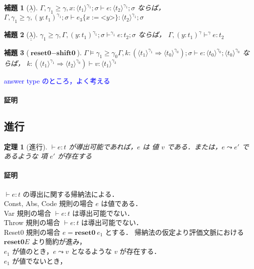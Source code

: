 \documentclass[10pt,a4j]{jarticle}
\newcommand\blue[1]{\textcolor{blue}{#1}}
\newcommand\Resetz{\textbf{reset0}}
\newcommand\Shiftz{\textbf{shift0}}
\newcommand\cfun[2]{\underline{\lambda}{#1}.{#2}}
\newcommand\ccfun[2]{\underline{\underline{\lambda}}{#1}.{#2}}
\newcommand\code[1]{\texttt{<}{#1}\texttt{>}}
\newcommand\codeT[2]{\langle{#1}\rangle^{#2}}
\newcommand\contT[2]{({#1} \Rightarrow {#2})}
\newcommand\ord{\ge}
\newcommand\lto{\leadsto}
\newcommand\ooi[1]{\blue{{#1}}}
\theoremstyle{break}
\newtheorem{theo}{定理}[section]
\newtheorem{lemm}{補題}[section]
\begin{document}




\begin{lemm}[$\underline{\lambda}$]
  $\Gamma, \gamma_1 \ord \gamma, x : \codeT{t_1}{\gamma_1} ; \sigma \vdash e : \codeT{t_2}{\gamma_1} ; \sigma$
  ならば，
  $\Gamma, \gamma_1 \ord \gamma, (y : t_1)^{\gamma_1} ; \sigma \vdash e_3\{x:=\code{y}\} : \codeT{t_2}{\gamma_1} ; \sigma$
\end{lemm}

\begin{lemm}[$\underline{\underline{\lambda}}$]
  $\gamma_1 \ord \gamma, \Gamma, (y : t_1)^{\gamma_1} ; \sigma \vdash^{\gamma_1} e : t_2 ; \sigma$
  ならば，
  $\Gamma, (y : t_1)^{\gamma} \vdash^{\gamma} e : t_2$
\end{lemm}

\begin{lemm}[$\Resetz - \Shiftz$]
  $\Gamma \models \gamma_1 \ord \gamma_0  \Gamma, k : \contT{\codeT{t_1}{\gamma_1}}{\codeT{t_0}{\gamma_0}} ; \sigma \vdash e : \codeT{t_0}{\gamma_0} ; \codeT{t_0}{\gamma_0}$
  ならば，
  $k : \contT{\codeT{t_1}{\gamma_1}}{\codeT{t_2}{\gamma_0}} \vdash v : \codeT{t_1}{\gamma_3}$
\end{lemm}

\ooi{answer type のところ，よく考える}

\paragraph{証明}


\subsection{進行}
\begin{theo}[進行]
  $\vdash e:t$ が導出可能であれば，$e$ は 値 $v$ である．または，$e \lto e'$ であるような 項 $e'$ が存在する
\end{theo}

\paragraph{証明}
$\vdash e:t$ の導出に関する帰納法による．\\
Const, Abs, Code 規則の場合 $e$ は値である．\\
Var 規則の場合 $\vdash e:t$ は導出可能でない．\\
Throw 規則の場合 $\vdash e:t$ は導出可能でない．\\
Reset0 規則の場合 $e = \Resetz~ e_1$ とする．
帰納法の仮定より評価文脈における $\Resetz E$ より簡約が進み，\\
$e_1$ が値のとき，$e \lto v$ となるような $v$ が存在する．\\
$e_1$ が値でないとき，
\end{document}
